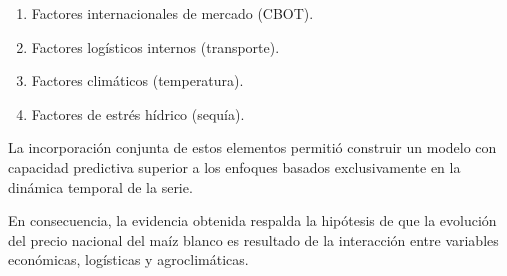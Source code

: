 \documentclass[11pt]{article}
\providecommand{\tightlist}{%
      \setlength{\itemsep}{0pt}\setlength{\parskip}{0pt}}
\begin{document}
\begin{enumerate}
\def\labelenumi{\arabic{enumi}.}
\tightlist
\item
  Factores internacionales de mercado (CBOT).
\item
  Factores logísticos internos (transporte).
\item
  Factores climáticos (temperatura).
\item
  Factores de estrés hídrico (sequía).
\end{enumerate}

La incorporación conjunta de estos elementos permitió construir un
modelo con capacidad predictiva superior a los enfoques basados
exclusivamente en la dinámica temporal de la serie.

En consecuencia, la evidencia obtenida respalda la hipótesis de que la
evolución del precio nacional del maíz blanco es resultado de la
interacción entre variables económicas, logísticas y agroclimáticas.
\end{document}
